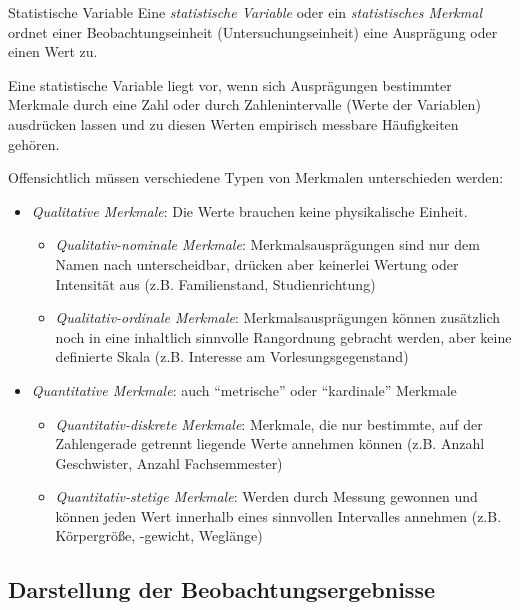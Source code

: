 \begin{defi}{Statistische Variable}
    Eine \emph{statistische Variable} oder ein \emph{statistisches Merkmal} ordnet einer Beobachtungseinheit (Untersuchungseinheit) eine Ausprägung oder einen Wert zu. 

    Eine statistische Variable liegt vor, wenn sich Ausprägungen bestimmter Merkmale durch eine Zahl oder durch Zahlenintervalle (Werte der Variablen) ausdrücken lassen und zu diesen Werten empirisch messbare Häufigkeiten gehören. 

    Offensichtlich müssen verschiedene Typen von Merkmalen unterschieden werden:
    \begin{itemize}
        \item \emph{Qualitative Merkmale}: 
            Die Werte brauchen keine physikalische Einheit. 
            \begin{itemize}
                \item \emph{Qualitativ-nominale Merkmale}:
                Merkmalsausprägungen sind nur dem Namen nach unterscheidbar, drücken aber keinerlei Wertung oder Intensität aus (z.B. Familienstand, Studienrichtung)
                \item \emph{Qualitativ-ordinale Merkmale}: 
                Merkmalsausprägungen können zusätzlich noch in eine inhaltlich sinnvolle Rangordnung gebracht werden, aber keine definierte Skala (z.B. Interesse am Vorlesungsgegenstand)
            \end{itemize}
        \item \emph{Quantitative Merkmale}: 
            auch \enquote{metrische} oder \enquote{kardinale} Merkmale
            \begin{itemize}
                \item \emph{Quantitativ-diskrete Merkmale}: 
                Merkmale, die nur bestimmte, auf der Zahlengerade getrennt liegende Werte annehmen können (z.B. Anzahl Geschwister, Anzahl Fachsemmester)
                \item \emph{Quantitativ-stetige Merkmale}: 
                Werden durch Messung gewonnen und können jeden Wert innerhalb eines sinnvollen Intervalles annehmen (z.B. Körpergröße, -gewicht, Weglänge)
            \end{itemize}
    \end{itemize}
\end{defi}

\subsection{Darstellung der Beobachtungsergebnisse}

